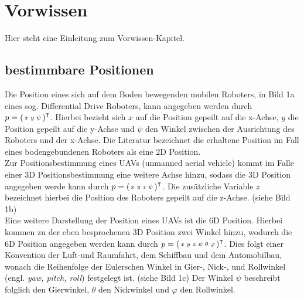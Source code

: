 \clearpage
\chapter{\textbf{Vorwissen}}\label{chap:Vorwissen}

Hier steht eine Einleitung zum Vorwissen-Kapitel.


\section{bestimmbare Positionen}\label{chap:bestimmbare Positionen}
Die Position eines sich auf dem Boden bewegenden mobilen Roboters, in Bild 1a  eines sog. Differential Drive Roboters, kann angegeben werden durch 
$p=\mathbf{\begin{psmallmatrix}
x & y & \psi
\end{psmallmatrix}}^\intercal$.
Hierbei bezieht sich $x$ auf die Position gepeilt auf die x-Achse, $y$ die Position gepeilt auf die y-Achse und $\psi$  den Winkel zwischen der Ausrichtung des Roboters und der x-Achse. Die Literatur bezeichnet die erhaltene Position im Fall eines bodengebundenen Roboters als eine 2D Position.\\
Zur Positionsbestimmung eines UAVs (unmanned aerial vehicle) kommt im Falle einer 3D Positionsbestimmung eine weitere Achse hinzu, sodass die 3D Position angegeben werde kann durch
$p=\mathbf{\begin{psmallmatrix}
x & y & z & \psi
\end{psmallmatrix}}^\intercal$.
Die zusätzliche Variable $z$ bezeichnet hierbei die Position des Roboters gepeilt auf die z-Achse. (siehe Bild 1b)\\
Eine weitere Darstellung der Position eines UAVs ist die 6D Position. Hierbei kommen zu der eben besprochenen 3D Position zwei Winkel hinzu, wodurch die 6D Position angegeben werden kann durch
$p=\mathbf{\begin{psmallmatrix}
x & y & z & \psi & \theta & \varphi
\end{psmallmatrix}}^\intercal$.
Dies folgt einer Konvention der Luft-und Raumfahrt, dem Schiffbau und dem Automobilbau, wonach die Reihenfolge der Eulerschen Winkel in Gier-, Nick-, und Rollwinkel (engl. \textit{yaw, pitch, roll}) festgelegt ist. (siehe Bild 1c) Der Winkel $\psi$ beschreibt folglich den Gierwinkel, $\theta$ den Nickwinkel und $\varphi$ den Rollwinkel.\\

